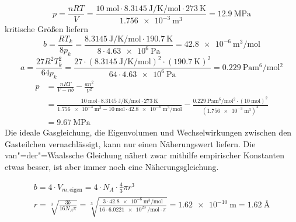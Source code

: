 \documentclass[DIV11]{scrartcl}
\begin{document}
\begin{solution}[name=Van-der-Waalssche Zustandsgleichung III]
\begin{tasks}
  \task
    \[
      p = \frac{nRT}{V}
        =
          \frac
            {
              \SI{10}{\mole} \cdot \SI{8.3145}{\joule\per\kelvin\per\mole}
              \cdot \SI{273}{\kelvin}
            }
            {\SI{1.756e-3}{\metre^3}}
        = \SI{12.9}{\mega\pascal}
    \]
  \task kritische Größen liefern
    \[
      b = \frac{RT_k}{8 p_k}
        = \frac
            {\SI{8.3145}{\joule\per\kelvin\per\mole}\cdot\SI{190.7}{\kelvin}}
            {8 \cdot\SI{4.63e6}{\pascal}}
        = \SI{42.8e-6}{\metre^3\per\mole}
    \]
    \[
      a = \frac{27 R^2 T_k^2}{64 p_k}
        = \frac
            {
              27 \cdot
              \left(
                \SI{8.3145}{\joule\per\kelvin\per\mole}
              \right)^2
              \cdot \left( \SI{190.7}{\kelvin} \right)^2
            }
             {64 \cdot \SI{4.63e6}{\pascal}}
        = \SI{0.229}{\pascal\metre^6\per\mole^2}
    \]
    \begin{align*}
     p &= \frac{nRT}{V - nb} - \frac{an^2}{V^2} \\
       &= \frac
            {
              \SI{10}{\mole} \cdot \SI{8.3145}{\joule\per\kelvin\per\mole} \cdot
              \SI{273}{\kelvin}
            }
            {\SI{1.756e-3}{\metre^3} - \SI{10}{\mole} \cdot
          \SI{42.8e-6}{\metre^3\per\mole}}
         -
          \frac
            {
              \SI{0.229}{\pascal\metre^6\per\mole^2} \cdot
              \left( \SI{10}{\mole} \right)^2
            }
            {\left( \SI{1.756e-3}{\metre^3} \right)^2} \\
       &= \SI{9.67}{\mega\pascal}
    \end{align*}
  \task Die ideale Gasgleichung, die Eigenvolumen und Wechselwirkungen zwischen
    den Gasteilchen vernachlässigt, kann nur einen Näherungswert liefern.  Die
    van"=der"=Waalssche Gleichung nähert zwar mithilfe empirischer Konstanten
    etwas besser, ist aber immer noch eine Näherungsgleichung.
  \item
    \begin{gather*}
      b = 4 \cdot V_{m,\text{eigen}}
        = 4 \cdot N_A \cdot \frac{4}{3} \pi r^3 \\
      r = \sqrt[3]{\frac{3 b}{16 N_A \pi}}
        = \sqrt[3]
            {
              \frac{3 \cdot \SI{42.8e-6}{\metre^3\per\mole}}{16 \cdot
              \SI{6.0221e23}{\per\mole} \cdot \pi}
            }
        = \SI{1.62e-10}{\metre} = \SI{1.62}{\angstrom}
    \end{gather*}
\end{tasks}
\end{solution}
\end{document}
